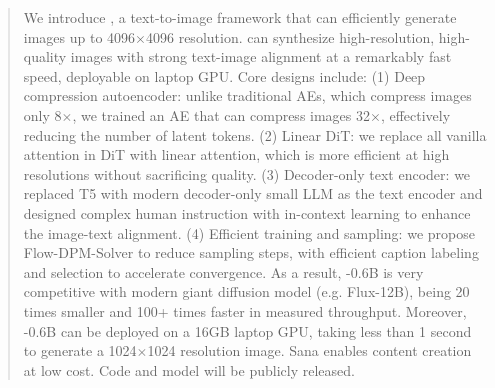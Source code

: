 

\begin{abstract}
    We introduce \model, a text-to-image framework that can efficiently generate images up to 4096$\times$4096 resolution.
    \model can synthesize high-resolution, high-quality images with strong text-image alignment at a remarkably fast speed, deployable on laptop GPU. 
    Core designs include: 
    (1) Deep compression autoencoder: unlike traditional AEs, which compress images only 8$\times$, we trained an AE that can compress images 32$\times$, effectively reducing the number of latent tokens. 
    (2) Linear DiT: we replace all vanilla attention in DiT with linear attention, which is more efficient at high resolutions without sacrificing quality.
    (3) Decoder-only text encoder: we replaced T5 with modern decoder-only small LLM as the text encoder and designed complex human instruction with in-context learning to enhance the image-text alignment.
    (4)  Efficient training and sampling: we propose Flow-DPM-Solver to reduce sampling steps, with efficient caption labeling and selection to accelerate convergence. 
    As a result, \model-0.6B is very competitive with modern giant diffusion model (e.g. Flux-12B), being 20 times smaller and 100+ times faster in measured throughput. 
    Moreover, \model-0.6B can be deployed on a 16GB laptop GPU, taking less than 1 second to generate a 1024$\times$1024 resolution image.
    Sana enables content creation at low cost. 
    Code and model will be publicly released.
    
\end{abstract}

